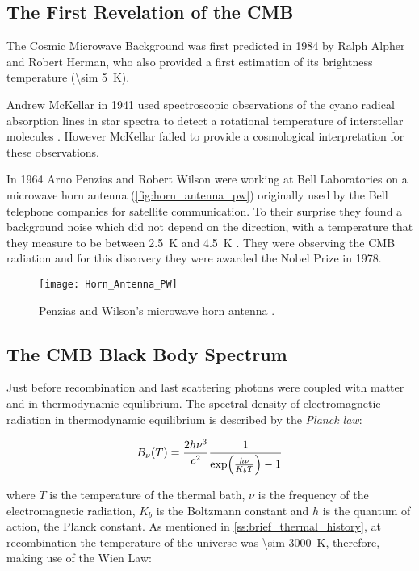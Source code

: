\subsection{The First Revelation of the CMB}

The Cosmic Microwave Background was first predicted in 1984 by Ralph Alpher
and Robert Herman, who also provided a first estimation of its brightness
temperature (\SI{\sim 5}{\kelvin}).

Andrew McKellar in 1941 used spectroscopic observations of the cyano
radical absorption lines in star spectra to detect a rotational temperature
of interstellar molecules \autocite{mckellar1941molecular}. However
McKellar failed to provide a cosmological interpretation for these
observations.

In 1964 Arno Penzias and Robert Wilson were working at Bell Laboratories on
a microwave horn antenna (\autoref{fig:horn_antenna_pw}) originally used by
the Bell telephone companies for satellite communication.  To their
surprise they found a background noise which did not depend on the
direction, with a temperature that they measure to be between
\SI{2.5}{\kelvin} and \SI{4.5}{\kelvin} \autocite{penzias1965measurement}.
They were observing the CMB radiation and for this discovery they were
awarded the Nobel Prize in 1978.

\begin{figure}
        \centering
        \texttt{[image: Horn\_Antenna\_PW]}
        \caption{Penzias and Wilson's microwave horn antenna
        \autocite{NASA_grin}.}
        \label{fig:horn_antenna_pw}
\end{figure}

\subsection{The CMB Black Body Spectrum}\label{ss:cmb_bb}

Just before recombination and last scattering photons were
coupled with matter and in thermodynamic equilibrium. The spectral density
of electromagnetic radiation in thermodynamic equilibrium is described by
the \emph{Planck law}:

\begin{equation}
        B_\nu\qty(T) = \frac{2h\nu^3}{c^2}
        \frac{1}{\exp(\frac{h\nu}{K_b T}) - 1}
\end{equation}

where $T$ is the temperature of the thermal bath, $\nu$ is the frequency of
the electromagnetic radiation, $K_b$ is the Boltzmann constant and $h$ is
the quantum of action, the Planck constant. As mentioned in
\autoref{ss:brief_thermal_history}, at recombination the temperature of the
universe was \SI{\sim 3000}{\kelvin}, therefore, making use of the Wien
Law:

